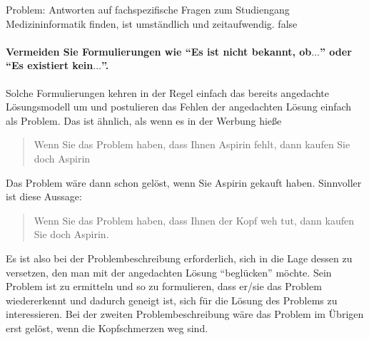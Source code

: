 Problem: Antworten auf fachspezifische Fragen zum Studiengang Medizininformatik finden, ist umständlich und zeitaufwendig.
\if false
\paragraph{Vermeiden Sie Formulierungen wie \enquote{Es ist nicht bekannt, ob$\ldots$} oder \enquote{Es existiert kein$\ldots$}.}
Solche Formulierungen kehren in der Regel einfach das bereits angedachte Lösungsmodell um und postulieren das Fehlen der angedachten Lösung einfach als Problem.
Das ist ähnlich, als wenn es in der Werbung hieße \blockquote{Wenn Sie das Problem haben, dass Ihnen Aspirin fehlt, dann kaufen Sie doch Aspirin}.
Das Problem wäre dann schon gelöst, wenn Sie Aspirin gekauft haben.
Sinnvoller ist diese Aussage:
\blockquote{Wenn Sie das Problem haben, dass Ihnen der Kopf weh tut, dann kaufen Sie doch Aspirin.}
Es ist also bei der Problembeschreibung erforderlich, sich in die Lage dessen zu versetzen, den man mit der angedachten Lösung \enquote{beglücken} möchte.
Sein Problem ist zu ermitteln und so zu formulieren, dass er/sie das Problem wiedererkennt und dadurch geneigt ist, sich für die Lösung des Problems zu interessieren.
Bei der zweiten Problembeschreibung wäre das Problem im Übrigen erst gelöst, wenn die Kopfschmerzen weg sind.


